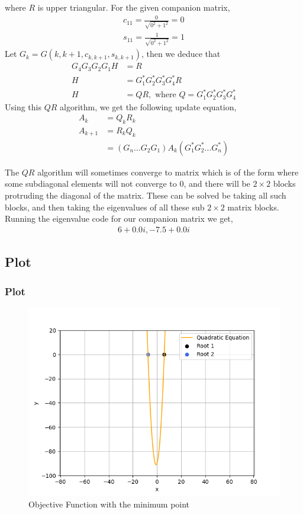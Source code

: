 \documentclass{beamer}
\providecommand{\brak}[1]{\ensuremath{\left(#1\right)}}
\theoremstyle{remark}
\numberwithin{equation}{section}
\begin{document}
\begin{frame}
where $R$ is upper triangular.
\newline
For the given companion matrix,
\begin{align}
  c_{11} = \frac{0}{\sqrt{0^2 + 1^2}} = 0\\
  s_{11} = \frac{1}{\sqrt{0^2 + 1^2}} = 1
\end{align}
Let $G_k = G\brak{k, k + 1, c_{k, k+1}, s_{k, k+1}}$, then we deduce that
\begin{align}
    G_4 G_3 G_2 G_1 H &= R\\
    H &= G_1^{\ast} G_2^{\ast} G_3^{\ast} G_4^{\ast} R\\
    H &= QR, \text{ where } Q = G_1^{\ast} G_2^{\ast} G_3^{\ast} G_4^{\ast}
\end{align}
Using this $QR$ algorithm, we get the following update equation,
\begin{align}
  A_{k} &= Q_{k}R_{k}\\
  A_{k + 1} &= R_{k}Q_{k}\\
            &= \brak{G_{n}\dots G_{2} G_{1}} A_{k} \brak{G_1^{\ast} G_2^{\ast} \dots G_n^{\ast}}
\end{align}
\end{frame}

\begin{frame}
    The $QR$ algorithm will sometimes converge to matrix which is of the form where some subdiagonal elements will not converge to 0, and there will be $2\times2$ blocks protruding the diagonal of the matrix. 
    These can be solved be taking all such blocks, and then taking the eigenvalues of all these sub $2\times 2$ matrix blocks.
    \newline
    \newline
    Running the eigenvalue code for our companion matrix we get,
    \begin{align}
        6 + 0.0i, -7.5 + 0.0i
    \end{align}
\end{frame}

\subsection{Plot}
\begin{frame}
\frametitle{Plot}
\begin{figure}[h!]
   \centering
   \includegraphics[width=0.7\linewidth]{figs/graph.png}
   \caption{Objective Function with the minimum point}
\end{figure}
\end{frame}
\end{document}
